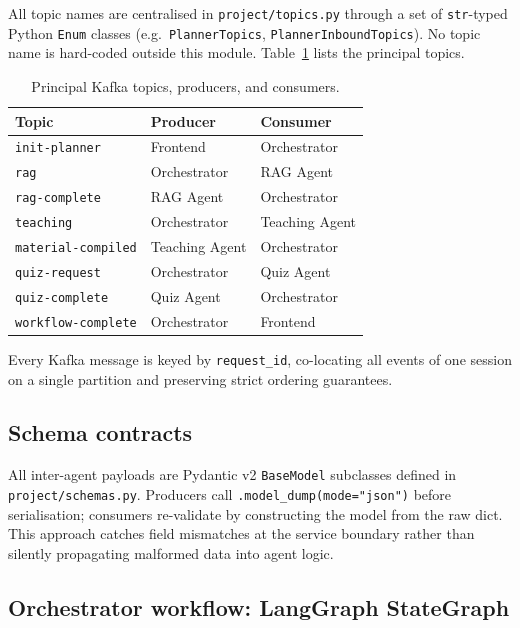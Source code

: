 \documentclass{ecai}
\begin{document}
All topic names are centralised in \texttt{project/topics.py} through a
set of \texttt{str}-typed Python \texttt{Enum} classes (e.g.\
\texttt{PlannerTopics}, \texttt{PlannerInboundTopics}). No topic name is
hard-coded outside this module. Table~\ref{tab:topics} lists the principal
topics.



\begin{table}[H]
\centering
\small
\begin{tabular}{lll}
\toprule
\textbf{Topic} & \textbf{Producer} & \textbf{Consumer} \\
\midrule
\texttt{init-planner}      & Frontend       & Orchestrator   \\
\texttt{rag}               & Orchestrator   & RAG Agent      \\
\texttt{rag-complete}      & RAG Agent      & Orchestrator   \\
\texttt{teaching}          & Orchestrator   & Teaching Agent \\
\texttt{material-compiled} & Teaching Agent & Orchestrator   \\
\texttt{quiz-request}      & Orchestrator   & Quiz Agent     \\
\texttt{quiz-complete}     & Quiz Agent     & Orchestrator   \\
\texttt{workflow-complete} & Orchestrator   & Frontend       \\
\bottomrule
\end{tabular}
\caption{Principal Kafka topics, producers, and consumers.}
\label{tab:topics}
\end{table}

Every Kafka message is keyed by \texttt{request\_id}, co-locating all
events of one session on a single partition and preserving strict ordering
guarantees.

\subsection{Schema contracts}

All inter-agent payloads are Pydantic v2 \texttt{BaseModel} subclasses
defined in \texttt{project/schemas.py}. Producers call
\texttt{.model\_dump(mode="json")} before serialisation; consumers
re-validate by constructing the model from the raw dict. This approach
catches field mismatches at the service boundary rather than silently
propagating malformed data into agent logic.

\subsection{Orchestrator workflow: LangGraph StateGraph}
\end{document}
